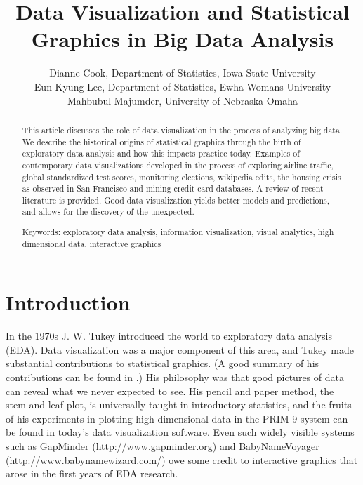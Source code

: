 \documentclass[11pt]{article}
\begin{document}
\title{Data Visualization and Statistical Graphics in Big Data Analysis}%
\author{Dianne Cook, Department of Statistics, Iowa State University\\
Eun-Kyung Lee, Department of Statistics, Ewha Womans University\\
Mahbubul Majumder, University of Nebraska-Omaha}
\maketitle

\begin{abstract}
This article discusses the role of data visualization in the process of analyzing big data. We describe the historical origins of statistical graphics through the birth of exploratory data analysis and how this impacts practice today. Examples of contemporary data visualizations developed in the process of exploring airline traffic, global standardized test scores, monitoring elections, wikipedia edits, the housing crisis as observed in San Francisco and mining credit card databases. A review of recent literature is provided. Good data visualization yields better models and predictions, and allows for the discovery of the unexpected.
\bigskip

Keywords:  exploratory data analysis, information visualization, visual analytics, high dimensional data, interactive graphics
\end {abstract}

\section{Introduction}

In the 1970s J. W. Tukey introduced the world to exploratory data analysis (EDA). Data visualization was a major component of this area, and Tukey made substantial contributions to statistical graphics. (A good summary of his contributions can be found in \citet{stuetzlefriedman2002}.) His philosophy was that good pictures of data can reveal what we never expected to see. His pencil and paper method, the stem-and-leaf plot, is universally taught in introductory statistics, and the fruits of his experiments in plotting high-dimensional data in the PRIM-9 system can be found in today's data visualization software. Even such widely visible systems such as GapMinder (\url{http://www.gapminder.org}) and BabyNameVoyager (\url{http://www.babynamewizard.com/}) owe some credit to interactive graphics that arose in the first years of EDA research.
\end{document}
